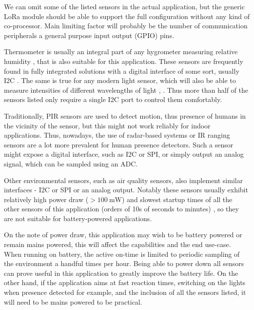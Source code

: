 We can omit some of the listed sensors in the actual application, but the generic LoRa module should be able to support the full configuration without any kind of co-processor. Main limiting factor will probably be the number of communication peripherals a general purpose input output (GPIO) pins.

Thermometer is usually an integral part of any hygrometer measuring relative humidity \cite{webster_humidity_1998}, that is also suitable for this application. These sensors are frequently found in fully integrated solutions with a digital interface of some sort, usually I2C \cite{bosch_sensortec_gmbh_bst-bme280-ds002pdf_2024}. The same is true for any modern light sensor, which will also be able to measure intensities of different wavelengths of light \cite{stmicroelectronics_ambient_2024}, \cite{texas_instruments_inc_light_2024}. Thus more than half of the sensors listed only require a single I2C port to control them comfortably.

Traditionally, PIR sensors are used to detect motion, thus presence of humans in the vicinity of the sensor, but this might not work reliably for indoor applications. Thus, nowadays, the use of radar-based systems \cite{infineon_technologies_presence_2024} or IR ranging sensors \cite{stmicroelectronics_human_2024} are a lot more prevalent for human presence detectors. Such a sensor might expose a digital interface, such as I2C or SPI, or simply output an analog signal, which can be sampled using an ADC.

Other environmental sensors, such as air quality sensors, also implement similar interfaces - I2C or SPI or an analog output. Notably these sensors usually exhibit relatively high power draw ($>100~\mathrm{mW}$) and slowest startup times of all the other sensors of this application (orders of 10s of seconds to minutes) \cite{amphenol_inc_mics-vz-89te_2024}, so they are not suitable for battery-powered applications.

On the note of power draw, this application may wish to be battery powered or remain mains powered, this will affect the capabilities and the end use-case. When running on battery, the active on-time is limited to periodic sampling of the environment a handful times per hour. Being able to power down all sensors can prove useful in this application to greatly improve the battery life. On the other hand, if the application aims at fast reaction times, switching on the lights when presence detected for example, and the inclusion of all the sensors listed, it will need to be mains powered to be practical.

